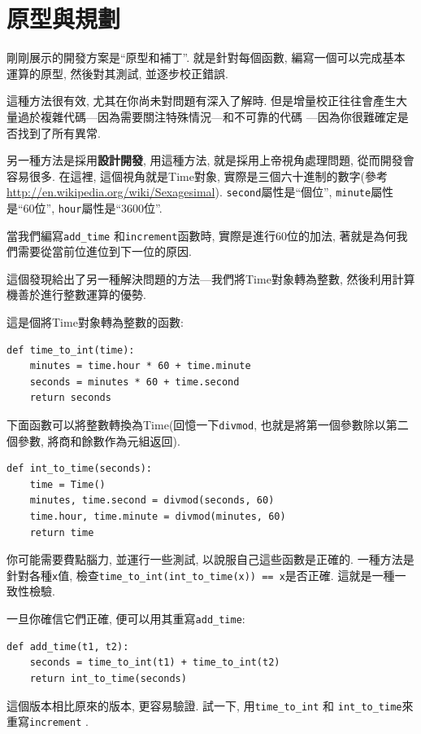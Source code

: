 \documentclass[10pt]{book}
\begin{document}
\section{原型與規劃}
\label{prototype}

剛剛展示的開發方案是``原型和補丁''.
就是針對每個函數, 編寫一個可以完成基本運算的原型, 然後對其測試, 
並逐步校正錯誤. 

這種方法很有效, 尤其在你尚未對問題有深入了解時. 
但是增量校正往往會產生大量過於複雜代碼---因為需要關注特殊情況---和不可靠的代碼
---因為你很難確定是否找到了所有異常. 

另一種方法是採用{\bf 設計開發}, 用這種方法, 就是採用上帝視角處理問題, 
從而開發會容易很多. 
在這裡, 這個視角就是Time對象, 實際是三個六十進制的數字(參考\url{http://en.wikipedia.org/wiki/Sexagesimal}). 
{\tt second}屬性是``個位'', {\tt minute}屬性是``60位'', {\tt hour}屬性是``3600位''.

當我們編寫\verb"add_time" 和{\tt increment}函數時, 
實際是進行60位的加法, 著就是為何我們需要從當前位進位到下一位的原因. 

這個發現給出了另一種解決問題的方法---我們將Time對象轉為整數, 
然後利用計算機善於進行整數運算的優勢. 

這是個將Time對象轉為整數的函數:

\begin{verbatim}
def time_to_int(time):
    minutes = time.hour * 60 + time.minute
    seconds = minutes * 60 + time.second
    return seconds
\end{verbatim}
%
下面函數可以將整數轉換為Time(回憶一下{\tt divmod}, 也就是將第一個參數除以第二個參數, 
將商和餘數作為元組返回). 

\begin{verbatim}
def int_to_time(seconds):
    time = Time()
    minutes, time.second = divmod(seconds, 60)
    time.hour, time.minute = divmod(minutes, 60)
    return time
\end{verbatim}
%
你可能需要費點腦力, 並運行一些測試, 以說服自己這些函數是正確的. 
一種方法是針對各種{\tt x}值, 檢查\verb"time_to_int(int_to_time(x)) == x"是否正確. 
這就是一種一致性檢驗. 

一旦你確信它們正確, 便可以用其重寫\verb"add_time":

\begin{verbatim}
def add_time(t1, t2):
    seconds = time_to_int(t1) + time_to_int(t2)
    return int_to_time(seconds)
\end{verbatim}
%
這個版本相比原來的版本, 更容易驗證. 
試一下, 用\verb"time_to_int" 和
\verb"int_to_time"來重寫{\tt increment} . 
\end{document}
